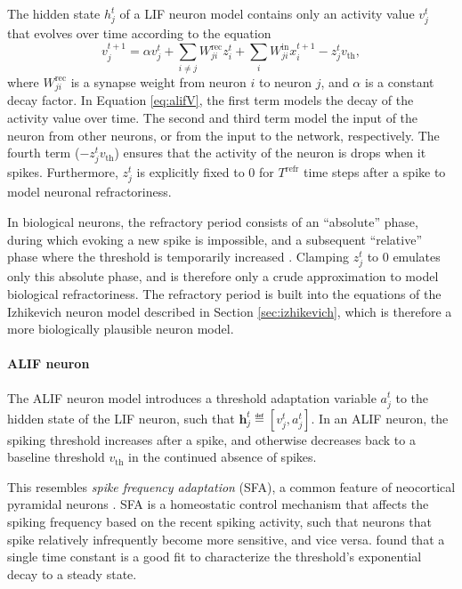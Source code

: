             The hidden state $h^t_j$ of a LIF neuron model contains only an activity value $v^t_j$ that evolves over time according to the equation
            \begin{equation}\label{eq:alifV}
            v^{t+1}_j = \alpha v_j^t + \sum_{i\neq j}W^\text{rec}_{ji}z_i^t + \sum_i W^\text{in}_{ji}x_i^{t+1} - z_j^tv_
            \text{th},
            \end{equation}
            where $W^\text{rec}_{ji}$ is a synapse weight from neuron $i$ to neuron $j$, and $\alpha$ is a constant decay factor.
            In Equation \ref{eq:alifV}, the first term models the decay of the activity value over time.
            The second and third term model the input of the neuron from other neurons, or from the input to the network, respectively.
            The fourth term ($-z^t_jv_\text{th}$) ensures that the activity of the neuron is drops when it spikes.
            Furthermore, $z^t_j$ is explicitly fixed to 0 for $T^\text{refr}$ time steps after a spike to model neuronal refractoriness.

            In biological neurons, the refractory period consists of an ``absolute'' phase, during which evoking a new spike is impossible, and a subsequent ``relative'' phase where the threshold is temporarily increased \citep{purves2008neuroscience}.
            Clamping $z^t_j$ to 0 emulates only this absolute phase, and is therefore only a crude approximation to model biological refractoriness.
            The refractory period is built into the equations of the Izhikevich neuron model described in Section \ref{sec:izhikevich}, which is therefore a more biologically plausible neuron model.


        \paragraph{ALIF neuron}
            The ALIF neuron model introduces a threshold adaptation variable $a^t_j$ to the hidden state of the LIF neuron, such that $\mathbf{h}^t_j \eqdef \left[v^t_j, a^t_j\right]$.
            In an ALIF neuron, the spiking threshold increases after a spike, and otherwise decreases back to a baseline threshold $v_\text{th}$ in the continued absence of spikes.

            This resembles \emph{spike frequency adaptation} (SFA), a common feature of neocortical pyramidal neurons \citep{benda2003universal}.
            SFA is a homeostatic control mechanism that affects the spiking frequency based on the recent spiking activity, such that neurons that spike relatively infrequently become more sensitive, and vice versa.
            \citet{ahmed1998estimates} found that a single time constant is a good fit to characterize the threshold's exponential decay to a steady state.


